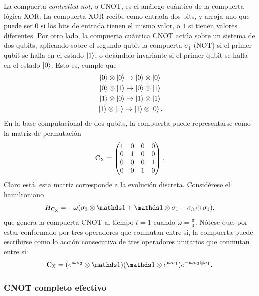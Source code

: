 La compuerta \textit{controlled not}, o CNOT, es el análogo cuántico de la compuerta lógica XOR. La compuerta XOR recibe como entrada dos bits, y arroja uno que puede ser $0$ si los bits de entrada tienen el mismo valor, o $1$ si tienen valores diferentes. Por otro lado, la compuerta cuántica CNOT actúa sobre un sistema de dos qubits, aplicando sobre el segundo qubit la compuerta $\sigma_{1}$ (NOT) si el primer qubit se halla en el estado $\ket{1}$, o dejándolo invariante si el primer qubit se halla en el estado $\ket{0}$. Esto es, cumple que \cite{Chuang}
\begin{align}
    \ket{0}\otimes\ket{0}\mapsto\ket{0}\otimes\ket{0}\nonumber\\
    \ket{0}\otimes\ket{1}\mapsto\ket{0}\otimes\ket{1}\nonumber\\
    \ket{1}\otimes\ket{0}\mapsto\ket{1}\otimes\ket{1}\nonumber\\
    \ket{1}\otimes\ket{1}\mapsto\ket{1}\otimes\ket{0} \rlap{.}\nonumber
\end{align}
En la base computacional de dos qubits, la compuerta puede representarse como la matriz de permutación
\begin{equation}
    \text{C}_{\text{X}}=\begin{pmatrix}
        1&0&0&0\\
        0&1&0&0\\
        0&0&0&1\\
        0&0&1&0
    \end{pmatrix}.\nonumber
\end{equation}
Claro está, esta matriz corresponde a la evolución discreta. Considérese el hamiltoniano
\begin{equation}
  H_{\cnot}=-\omega(\pauli{3}\otimes\Id+\Id\otimes\pauli{1}-\pauli{3}\otimes\pauli{1}),\nonumber
\end{equation}
que genera la compuerta CNOT al tiempo $t=1$ cuando $\omega=\frac{\pi}{4}$. Nótese que, por estar conformado por tres operadores que conmutan entre sí, la compuerta puede escribirse como lo acción consecutiva de tres operadores unitarios que conmutan entre sí:
\begin{equation}
  \cnot=(e^{\rmi\omega\pauli{3}}\otimes \Id) (\Id \otimes e^{\rmi\omega\pauli{1}}) e^{-\rmi\omega\pauli{3}\otimes\pauli{1}}.\nonumber
\end{equation}

\subsubsection{CNOT completo efectivo}

